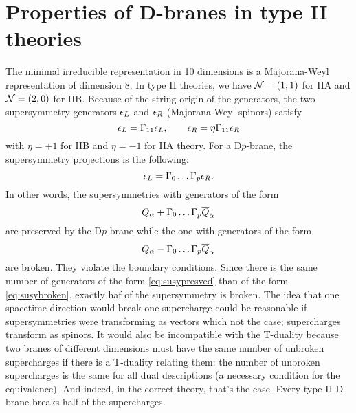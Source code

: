 \documentclass[a4paper,11pt]{article}
\begin{document}
\section{Properties of D-branes in type II theories}

    The minimal irreducible representation in 10 dimensions is a Majorana-Weyl representation of dimension 8. In type II theories, we have $\mathcal{N}=(1,1)$ for IIA and $\mathcal{N}=(2,0)$ for IIB. Because of the string origin of the generators, the two supersymmetry generators $\epsilon_L$ and $\epsilon_R$ (Majorana-Weyl spinors) satisfy
    \begin{equation}
        \epsilon_L=\Gamma_{11}\epsilon_L,\qquad \epsilon_R=\eta\Gamma_{11}\epsilon_R
    \end{equation}
    with $\eta=+1$ for IIB and $\eta=-1$ for IIA theory. For a D$p$-brane, the supersymmetry projections is the following:
    \begin{equation}
        \epsilon_L=\Gamma_0\dots\Gamma_p\epsilon_R.
    \end{equation}
    In other words, the supersymmetries with generators of the form
    \begin{equation}
        Q_\alpha+\Gamma_0\dots\Gamma_p\overline{Q}_{\dot{\alpha}}\label{eq:susypresved}
    \end{equation}
    are preserved by the D$p$-brane while the one with generators of the form
    \begin{equation}
        Q_\alpha-\Gamma_0\dots\Gamma_p\overline{Q}_{\dot{\alpha}}\label{eq:susybroken}
    \end{equation}
    are broken. They violate the boundary conditions. Since there is the same number of generators of the form \eqref{eq:susypresved} than of the form \eqref{eq:susybroken}, exactly haf of the supersymmetry is broken. The idea that one spacetime direction would break one supercharge could be reasonable if supersymmetries were transforming as vectors which not the case; supercharges transform as spinors. It would also be incompatible with the T-duality because two branes of different dimensions must have the same number of unbroken supercharges if there is a T-duality relating them: the number of unbroken supercharges is the same for all dual descriptions (a necessary condition for the equivalence). And indeed, in the correct theory, that's the case. Every type II D-brane breaks half of the supercharges.
\end{document}
